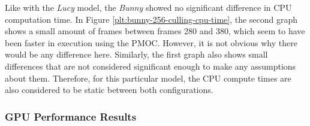 \noindent
Like with the \emph{Lucy} model, the \emph{Bunny} showed no significant difference in \ac{CPU} computation time. 
In Figure \ref{plt:bunny-256-culling-cpu-time}, the second graph shows a small amount of frames between frames 280 
and 380, which seem to have been faster in execution using the \ac{PMOC}. However, it is not 
obvious why there would be any difference here. Similarly, the first graph also shows small differences that are 
not considered significant enough to make any assumptions about them. Therefore, for this particular model, the 
\ac{CPU} compute times are also considered to be static between both configurations.

\subsubsection*{GPU Performance Results} \label{subsubsec-gpu-performance-results-bunny}

